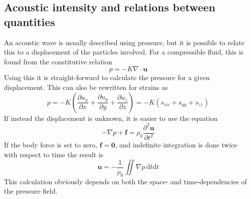 \documentclass[11pt,twoside]{eitExjobb}
\begin{document}
	\subsection{Acoustic intensity and relations between quantities}
	An acoustic wave is usually described using pressure, but it is possible to relate this to a displacement of the particles involved. For a compressible fluid, this is found from the constitutive relation \cite{Schmerr2016}
	\begin{equation}
		p = -K \nabla \cdot \bm{u}
		\label{eq:th-pressure-from-displ}
	\end{equation}
	Using this it is straight-forward to calculate the pressure for a given displacement. This can also be rewritten for strains as
	\begin{equation*}
		p = -K \left( \frac{\partial u_x}{\partial x} + \frac{\partial u_y}{\partial y} + \frac{\partial u_z}{\partial z} \right) = -K (s_{xx} + s_{yy} + s_{zz})
	\end{equation*}
	If instead the displacement is unknown, it is easier to use the equation \cite{Schmerr2016}
	\begin{equation*}
		-\nabla p + \bm{f} = \rho_0 \frac{\partial^2 \bm{u}}{\partial t^2}
	\end{equation*}
	If the body force is set to zero, $\bm{f} = \bm{0}$, and indefinite integration is done twice with respect to time the result is
	\begin{equation}
	\bm{u} = -\frac{1}{\rho_0} \iint \nabla p \, \mathrm{d}t \mathrm{d}t
	\label{eq:th-displ-from-pressure}
	\end{equation}
	This calculation obviously depends on both the space- and time-dependencies of the pressure field.
	
\end{document}
